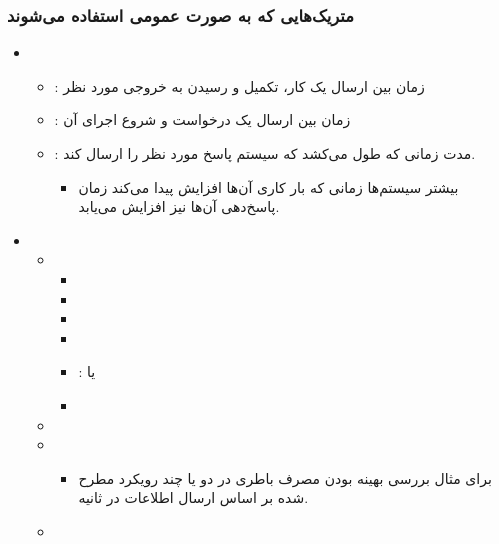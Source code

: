 \subsubsection{متریک‌هایی که به صورت عمومی استفاده می‌شوند}

\begin{itemize}
    \item {}
    \begin{itemize}
        \item {}: زمان بین ارسال یک کار، تکمیل و رسیدن به
        خروجی مورد نظر
        \item {}: زمان بین ارسال یک درخواست و شروع اجرا‌ی آن
        \item {}: مدت زمانی که طول می‌کشد که سیستم پاسخ مورد
        نظر را ارسال کند.
        \begin{itemize}
            \item بیشتر سیستم‌ها زمانی که بار کاری آن‌ها افزایش پیدا می‌کند زمان
            پاسخ‌دهی آن‌ها نیز افزایش می‌یابد.
        \end{itemize}
    \end{itemize}
    \item {}
    \begin{itemize}
        \item {}
        \begin{itemize}
            \item {}
            \item {}
            \item {}
            \item {}
            \item {}:  یا 
            \item {}
        \end{itemize}
        \item {}
        \item {}
        \begin{itemize}
            \item برای مثال بررسی بهینه بودن مصرف باطری در دو یا چند رویکرد مطرح
            شده بر اساس ارسال اطلاعات در ثانیه.
        \end{itemize}
        \item {}

\end{itemize}
\end{itemize}
